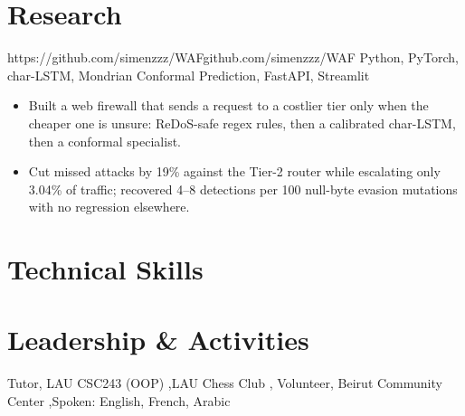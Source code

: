 \documentclass[10pt, a4paper]{article}
\begin{document}
\section{Research}

%
  {https://github.com/simenzzz/WAF}{github.com/simenzzz/WAF}%
  {Python, PyTorch, char-LSTM, Mondrian Conformal Prediction, FastAPI, Streamlit}
\begin{itemize}
  \item Built a web firewall that sends a request to a costlier tier only when
        the cheaper one is unsure: ReDoS-safe regex rules, then a calibrated
        char-LSTM, then a conformal specialist.
  \item Cut missed attacks by 19\% against the Tier-2 router while escalating
        only 3.04\% of traffic; recovered 4--8 detections per 100 null-byte
        evasion mutations with no regression elsewhere.
\end{itemize}

\section{Technical Skills}


\section{Leadership \& Activities}

Tutor, LAU CSC243 (OOP) \sep LAU Chess Club \sep
Volunteer, Beirut Community Center \sep Spoken: English, French, Arabic
\end{document}
